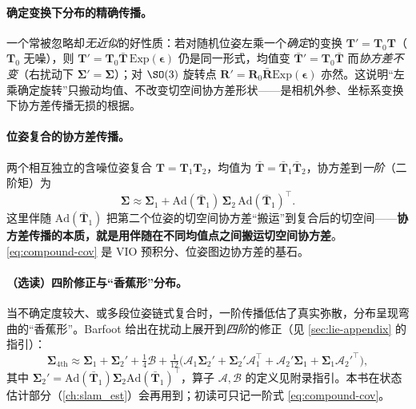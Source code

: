 \paragraph{确定变换下分布的精确传播。}一个常被忽略却\emph{无近似}的好性质：若对随机位姿左乘一个\emph{确定}的变换 $\mathbf{T}'=\mathbf{T}_0\mathbf{T}$（$\mathbf{T}_0$ 无噪），则 $\mathbf{T}'=\mathbf{T}_0\bar{\mathbf{T}}\,\mathrm{Exp}(\boldsymbol{\epsilon})$ 仍是同一形式，均值变 $\bar{\mathbf{T}}'=\mathbf{T}_0\bar{\mathbf{T}}$ 而\emph{协方差不变}（右扰动下 $\boldsymbol{\Sigma}'=\boldsymbol{\Sigma}$）；对 $\SO(3)$ 旋转点 $\mathbf{R}'=\mathbf{R}_0\bar{\mathbf{R}}\mathrm{Exp}(\boldsymbol{\epsilon})$ 亦然。这说明“左乘确定旋转”只搬动均值、不改变切空间协方差形状——是相机外参、坐标系变换下协方差传播无损的根据。

\paragraph{位姿复合的协方差传播。}两个相互独立的含噪位姿复合 $\mathbf{T}=\mathbf{T}_1\mathbf{T}_2$，均值为 $\bar{\mathbf{T}}=\bar{\mathbf{T}}_1\bar{\mathbf{T}}_2$，协方差到\emph{一阶}（二阶矩）为
\begin{equation}
  \boldsymbol{\Sigma}\approx\boldsymbol{\Sigma}_1+\mathrm{Ad}(\bar{\mathbf{T}}_1)\,\boldsymbol{\Sigma}_2\,\mathrm{Ad}(\bar{\mathbf{T}}_1)^\top.
  \label{eq:compound-cov}
\end{equation}
这里伴随 $\mathrm{Ad}(\bar{\mathbf{T}}_1)$ 把第二个位姿的切空间协方差“搬运”到复合后的切空间——\textbf{协方差传播的本质，就是用伴随在不同均值点之间搬运切空间协方差}。\cref{eq:compound-cov} 是 VIO 预积分、位姿图边协方差的基石。

\paragraph{（选读）四阶修正与“香蕉形”分布。}当不确定度较大、或多段位姿链式复合时，一阶传播低估了真实弥散，分布呈现弯曲的“香蕉形”。Barfoot 给出在扰动上展开到\emph{四阶}的修正（见 \cref{sec:lie-appendix} 的指引）：
\begin{equation}
  \boldsymbol{\Sigma}_{4\text{th}}\approx\boldsymbol{\Sigma}_1+\boldsymbol{\Sigma}_2'+\tfrac14\boldsymbol{\mathcal{B}}+\tfrac{1}{12}\big(\boldsymbol{\mathcal{A}}_1\boldsymbol{\Sigma}_2'+\boldsymbol{\Sigma}_2'\boldsymbol{\mathcal{A}}_1^\top+\boldsymbol{\mathcal{A}}_2'\boldsymbol{\Sigma}_1+\boldsymbol{\Sigma}_1\boldsymbol{\mathcal{A}}_2'^\top\big),
  \label{eq:fourth-order}
\end{equation}
其中 $\boldsymbol{\Sigma}_2'=\mathrm{Ad}(\bar{\mathbf{T}}_1)\boldsymbol{\Sigma}_2\mathrm{Ad}(\bar{\mathbf{T}}_1)^\top$，算子 $\boldsymbol{\mathcal{A}},\boldsymbol{\mathcal{B}}$ 的定义见附录指引。本书在状态估计部分（\cref{ch:slam_est}）会再用到；初读可只记一阶式 \cref{eq:compound-cov}。

